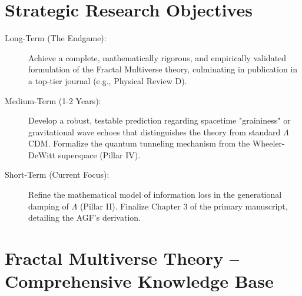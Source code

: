 \documentclass[aps,prd,onecolumn,10pt,superscriptaddress,nofootinbib,floatfix]{revtex4-2}
\begin{document}
\section{Strategic Research Objectives}
\begin{description}
    \item[Long-Term (The Endgame):] Achieve a complete, mathematically rigorous, and empirically validated formulation of the Fractal Multiverse theory, culminating in publication in a top-tier journal (e.g., Physical Review D).
    \item[Medium-Term (1-2 Years):] Develop a robust, testable prediction regarding spacetime "graininess" or gravitational wave echoes that distinguishes the theory from standard $\Lambda$CDM. Formalize the quantum tunneling mechanism from the Wheeler-DeWitt superspace (Pillar IV).
    \item[Short-Term (Current Focus):] Refine the mathematical model of information loss in the generational damping of $\Lambda$ (Pillar II). Finalize Chapter 3 of the primary manuscript, detailing the AGF's derivation.
\end{description}

\section{Fractal Multiverse Theory – Comprehensive Knowledge Base}
\end{document}
